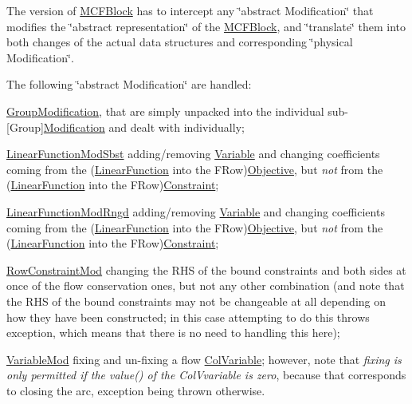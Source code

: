 The version of \mbox{\hyperlink{class_s_m_spp__di__unipi__it_1_1_m_c_f_block}{M\+C\+F\+Block}} has to intercept any \char`\"{}abstract Modification\char`\"{} that modifies the \char`\"{}abstract representation\char`\"{} of the \mbox{\hyperlink{class_s_m_spp__di__unipi__it_1_1_m_c_f_block}{M\+C\+F\+Block}}, and \char`\"{}translate\char`\"{} them into both changes of the actual data structures and corresponding \char`\"{}physical Modification\char`\"{}.

The following \char`\"{}abstract Modification\char`\"{} are handled\+:


\begin{DoxyItemize}
\item \mbox{\hyperlink{class_s_m_spp__di__unipi__it_1_1_group_modification}{Group\+Modification}}, that are simply unpacked into the individual sub-\/\mbox{[}Group\mbox{]}\mbox{\hyperlink{class_s_m_spp__di__unipi__it_1_1_modification}{Modification}} and dealt with individually;
\item \mbox{\hyperlink{class_s_m_spp__di__unipi__it_1_1_linear_function_mod_sbst}{Linear\+Function\+Mod\+Sbst}} adding/removing \mbox{\hyperlink{class_s_m_spp__di__unipi__it_1_1_variable}{Variable}} and changing coefficients coming from the (\mbox{\hyperlink{class_s_m_spp__di__unipi__it_1_1_linear_function}{Linear\+Function}} into the F\+Row)\mbox{\hyperlink{class_s_m_spp__di__unipi__it_1_1_objective}{Objective}}, but {\itshape not} from the (\mbox{\hyperlink{class_s_m_spp__di__unipi__it_1_1_linear_function}{Linear\+Function}} into the F\+Row)\mbox{\hyperlink{class_s_m_spp__di__unipi__it_1_1_constraint}{Constraint}};
\item \mbox{\hyperlink{class_s_m_spp__di__unipi__it_1_1_linear_function_mod_rngd}{Linear\+Function\+Mod\+Rngd}} adding/removing \mbox{\hyperlink{class_s_m_spp__di__unipi__it_1_1_variable}{Variable}} and changing coefficients coming from the (\mbox{\hyperlink{class_s_m_spp__di__unipi__it_1_1_linear_function}{Linear\+Function}} into the F\+Row)\mbox{\hyperlink{class_s_m_spp__di__unipi__it_1_1_objective}{Objective}}, but {\itshape not} from the (\mbox{\hyperlink{class_s_m_spp__di__unipi__it_1_1_linear_function}{Linear\+Function}} into the F\+Row)\mbox{\hyperlink{class_s_m_spp__di__unipi__it_1_1_constraint}{Constraint}};
\item \mbox{\hyperlink{class_s_m_spp__di__unipi__it_1_1_row_constraint_mod}{Row\+Constraint\+Mod}} changing the R\+HS of the bound constraints and both sides at once of the flow conservation ones, but not any other combination (and note that the R\+HS of the bound constraints may not be changeable at all depending on how they have been constructed; in this case attempting to do this throws exception, which means that there is no need to handling this here);
\item \mbox{\hyperlink{class_s_m_spp__di__unipi__it_1_1_variable_mod}{Variable\+Mod}} fixing and un-\/fixing a flow \mbox{\hyperlink{class_s_m_spp__di__unipi__it_1_1_col_variable}{Col\+Variable}}; however, note that {\itshape fixing is only permitted if the value() of the Col\+Vvariable is zero}, because that corresponds to closing the arc, exception being thrown otherwise.
\end{DoxyItemize}

